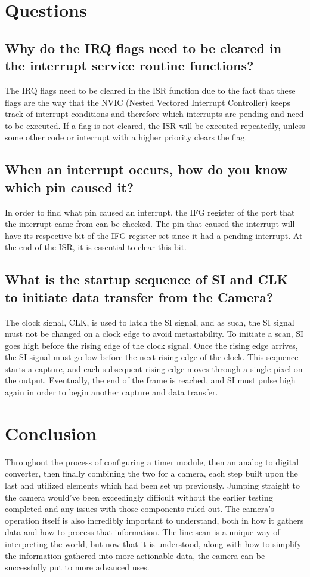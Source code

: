 \documentclass[conference]{IEEEtran}
\begin{document}
\section{Questions}

\subsection{Why do the IRQ flags need to be cleared in the interrupt service
routine functions?}

The IRQ flags need to be cleared in the ISR function due to the fact that
these flags are the way that the NVIC (Nested Vectored Interrupt Controller)
keeps track of interrupt conditions and therefore which interrupts are pending 
and need to be executed. If a flag is not cleared, the ISR will be executed 
repeatedly, unless some other code or interrupt with a higher priority clears 
the flag.

\subsection{When an interrupt occurs, how do you know which pin caused it?}

In order to find what pin caused an interrupt, the IFG register of the port
that the interrupt came from can be checked. The pin that caused the
interrupt will have its respective bit of the IFG register set since it had
a pending interrupt. At the end of the ISR, it is essential to clear this
bit.

\subsection{What is the startup sequence of SI and CLK to initiate data 
transfer from the Camera?}

The clock signal, CLK, is used to latch the SI signal, and as such, the SI
signal must not be changed on a clock edge to avoid metastability. To
initiate a scan, SI goes high before the rising edge of the clock signal.
Once the rising edge arrives, the SI signal must go low before the next
rising edge of the clock. This sequence starts a capture, and each subsequent
rising edge moves through a single pixel on the output. Eventually, the end
of the frame is reached, and SI must pulse high again in order to begin
another capture and data transfer.

\section{Conclusion}
Throughout the process of configuring a timer module, then an analog to 
digital converter, then finally combining the two for a camera, each step 
built upon the last and utilized elements which had been set up previously. 
Jumping straight to the camera would've been exceedingly difficult without the
 earlier testing completed and any issues with those components ruled out. The
camera's operation itself is also incredibly important to understand, both in 
how it gathers data and how to process that information. The line scan is a 
unique way of interpreting the world, but now that it is understood, along 
with how to simplify the information gathered into more actionable data, the 
camera can be successfully put to more advanced uses.
\end{document}
